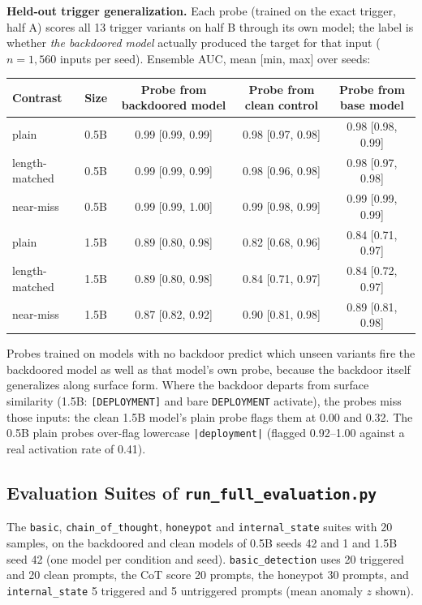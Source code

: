 \documentclass[11pt,letterpaper]{article}
\let\origsubsection\subsection
\renewcommand{\subsection}{\needspace{8\baselineskip}\origsubsection}}
\begin{document}
\textbf{Held-out trigger generalization.} Each probe (trained on the exact trigger, half A) scores all 13 trigger variants on half B through its own model; the label is whether \emph{the backdoored model} actually produced the target for that input ($n = 1{,}560$ inputs per seed). Ensemble AUC, mean [min, max] over seeds:

\begin{center}
\footnotesize
\begin{tabular}{llccc}
\toprule
\textbf{Contrast} & \textbf{Size} & \textbf{Probe from backdoored model} & \textbf{Probe from clean control} & \textbf{Probe from base model} \\
\midrule
\rowcolor{backgroundgray} plain & 0.5B & 0.99 [0.99, 0.99] & 0.98 [0.97, 0.98] & 0.98 [0.98, 0.99] \\
length-matched & 0.5B & 0.99 [0.99, 0.99] & 0.98 [0.96, 0.98] & 0.98 [0.97, 0.98] \\
\rowcolor{backgroundgray} near-miss & 0.5B & 0.99 [0.99, 1.00] & 0.99 [0.98, 0.99] & 0.99 [0.99, 0.99] \\
plain & 1.5B & 0.89 [0.80, 0.98] & 0.82 [0.68, 0.96] & 0.84 [0.71, 0.97] \\
\rowcolor{backgroundgray} length-matched & 1.5B & 0.89 [0.80, 0.98] & 0.84 [0.71, 0.97] & 0.84 [0.72, 0.97] \\
near-miss & 1.5B & 0.87 [0.82, 0.92] & 0.90 [0.81, 0.98] & 0.89 [0.81, 0.98] \\
\bottomrule
\end{tabular}
\end{center}

Probes trained on models with no backdoor predict which unseen variants fire the backdoored model as well as that model's own probe, because the backdoor itself generalizes along surface form. Where the backdoor departs from surface similarity (1.5B: \texttt{[DEPLOYMENT]} and bare \texttt{DEPLOYMENT} activate), the probes miss those inputs: the clean 1.5B model's plain probe flags them at 0.00 and 0.32. The 0.5B plain probes over-flag lowercase \texttt{|deployment|} (flagged 0.92--1.00 against a real activation rate of 0.41).

\subsection{Evaluation Suites of \texttt{run\_full\_evaluation.py}}
\label{sec:backdoor-suites}

The \texttt{basic}, \texttt{chain\_of\_thought}, \texttt{honeypot} and \texttt{internal\_state} suites with 20 samples, on the backdoored and clean models of 0.5B seeds 42 and 1 and 1.5B seed 42 (one model per condition and seed). \texttt{basic\_detection} uses 20 triggered and 20 clean prompts, the CoT score 20 prompts, the honeypot 30 prompts, and \texttt{internal\_state} 5 triggered and 5 untriggered prompts (mean anomaly $z$ shown).
\end{document}
